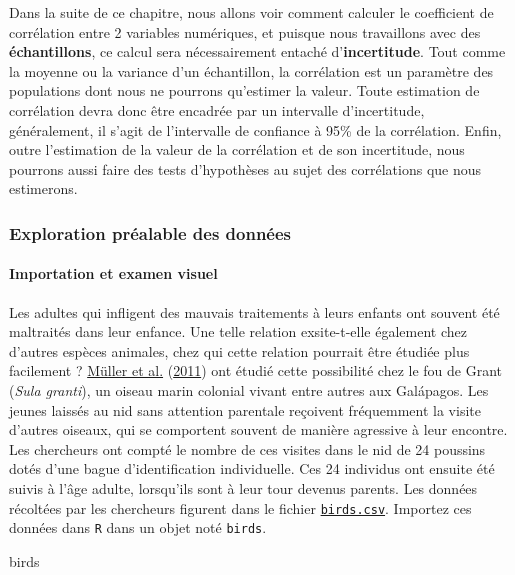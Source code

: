 \documentclass[
  a4paper,
]{article}
\newenvironment{Shaded}{\begin{snugshade}}{\end{snugshade}}
\newcommand{\NormalTok}[1]{\textcolor[rgb]{0.12,0.11,0.11}{#1}}
\begin{document}
Dans la suite de ce chapitre, nous allons voir comment calculer le coefficient de corrélation entre 2 variables numériques, et puisque nous travaillons avec des \textbf{échantillons}, ce calcul sera nécessairement entaché d'\textbf{incertitude}. Tout comme la moyenne ou la variance d'un échantillon, la corrélation est un paramètre des populations dont nous ne pourrons qu'estimer la valeur. Toute estimation de corrélation devra donc être encadrée par un intervalle d'incertitude, généralement, il s'agit de l'intervalle de confiance à 95\% de la corrélation. Enfin, outre l'estimation de la valeur de la corrélation et de son incertitude, nous pourrons aussi faire des tests d'hypothèses au sujet des corrélations que nous estimerons.

\hypertarget{exploration-pruxe9alable-des-donnuxe9es-2}{%
\subsubsection{Exploration préalable des données}\label{exploration-pruxe9alable-des-donnuxe9es-2}}

\hypertarget{importation-et-examen-visuel-4}{%
\paragraph{Importation et examen visuel}\label{importation-et-examen-visuel-4}}

Les adultes qui infligent des mauvais traitements à leurs enfants ont souvent été maltraités dans leur enfance. Une telle relation exsite-t-elle également chez d'autres espèces animales, chez qui cette relation pourrait être étudiée plus facilement ? \protect\hyperlink{ref-muller2011}{Müller et al.} (\protect\hyperlink{ref-muller2011}{2011}) ont étudié cette possibilité chez le fou de Grant (\emph{Sula granti}), un oiseau marin colonial vivant entre autres aux Galápagos. Les jeunes laissés au nid sans attention parentale reçoivent fréquemment la visite d'autres oiseaux, qui se comportent souvent de manière agressive à leur encontre. Les chercheurs ont compté le nombre de ces visites dans le nid de 24 poussins dotés d'une bague d'identification individuelle. Ces 24 individus ont ensuite été suivis à l'âge adulte, lorsqu'ils sont à leur tour devenus parents. Les données récoltées par les chercheurs figurent dans le fichier \href{https://besibo.github.io/Biometrie3/data/birds.csv}{\texttt{birds.csv}}. Importez ces données dans \texttt{R} dans un objet noté \texttt{birds}.

\begin{Shaded}
\begin{Highlighting}[]
\NormalTok{birds}
\end{Highlighting}
\end{Shaded}
\end{document}
